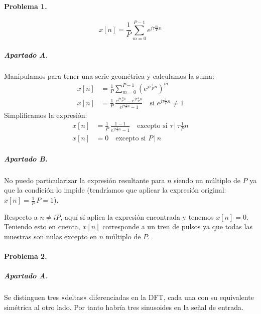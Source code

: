 


\startpage

\paragraph{Problema 1.}

\begin{equation*}
  x[n] = \frac{1}{P} \sum_{m=0}^{P-1} e^{j\tau\frac{m}{P}n}
\end{equation*}

\subparagraph{Apartado A.}

Manipulamos para tener una serie geométrica y calculamos la suma:
%
\begin{align*}
  x[n] &= \frac{1}{P} \sum_{m=0}^{P-1} \left( e^{j\tau\frac{1}{P}n} \right)^{m}
\\
  x[n] &= \frac{1}{P} \, \frac{ e^{j\tau\frac{P}{P}n} - e^{j\tau\frac{0}{P}n} }{
    e^{j\tau\frac{1}{P}n} - 1 }
    \quad \text{si $e^{j\tau\frac{1}{P}n} \neq 1$}
\end{align*}
%
Simplificamos la expresión:
%
\begin{align*}
  x[n] &= \frac{1}{P} \, \frac{ 1 - 1 }{
    e^{j\tau\frac{1}{P}n} - 1 }
    \quad \text{excepto si $\tau \,|\, \tau\frac{1}{P}n$}
\\
  x[n] &= 0
    \quad \text{excepto si $P \,|\, n$}
\end{align*}

\subparagraph{Apartado B.}

No puedo particularizar la expresión resultante para $n$ siendo un múltiplo de
$P$ ya que la condición lo impide (tendríamos que aplicar la expresión
original: $ x[n] = \frac{1}{P} \, P = 1 $).

Respecto a $n \neq iP$, aquí sí aplica la expresión encontrada y tenemos $x[n]
= 0$. Teniendo esto en cuenta, $x[n]$ corresponde a un tren de pulsos ya que
todas las muestras son nulas excepto en $n$ múltiplo de $P$.

\finishpage


\startpage
\paragraph{Problema 2.}

\subparagraph{Apartado A.}

Se distinguen tres «deltas» diferenciadas en la DFT, cada una con su
equivalente simétrica al otro lado. Por tanto habría tres sinusoides en la
señal de entrada.


